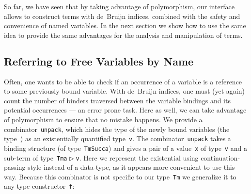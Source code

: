 \documentclass[9pt,preprint,authoryear]{sigplanconf}
\begin{document}
%
So far, we have seen that by taking advantage of polymorphism, 
    our interface allows to construct
    terms with de{~}Bruijn indices, combined with the safety and
    convenience of named variables. In the next section we show how
    to use the same idea to provide the same advantages for the analysis
    and manipulation of terms.%


\subsection{Referring to Free Variables by Name}

%
Often, one wants to be able to check if an
    occurrence of a variable is a reference to some previously bound
    variable. With de{~}Bruijn indices, one must (yet again) count the
    number of binders traversed between the variable bindings and
    its potential occurrences --- an error prone task. Here as well,
    we can take advantage of polymorphism to ensure that no mistake
    happens. We provide a combinator{~}\textcolor[rgb]{0,0,0.80}{\texttt{unpack}}, which hides the 
    type of the newly bound variables (the type{~}\textcolor[cmyk]{0,0.65,0.99,0}{\texttt{\makebox[1.22ex][l]{$ {(} $}}}\textcolor[cmyk]{0,0.65,0.99,0}{\texttt{\makebox[1.22ex][r]{$ {)} $}}}) as an existentially
    quantified type{~}\textcolor[rgb]{0,0,0.80}{\texttt{v}}. The combinator{~}\textcolor[rgb]{0,0,0.80}{\texttt{unpack}} takes a binding
    structure (of type{~}\textcolor[rgb]{0,0,0.80}{\texttt{Tm}}\textcolor[rgb]{0,0,0.80}{\texttt{\mbox{\hspace{0.50em}}}}\textcolor[cmyk]{0,0.65,0.99,0}{\texttt{\makebox[1.22ex][l]{$ {(} $}}}\textcolor[rgb]{0,0,0.80}{\texttt{Succ}}\textcolor[rgb]{0,0,0.80}{\texttt{\mbox{\hspace{0.50em}}}}\textcolor[rgb]{0,0,0.80}{\texttt{a}}\textcolor[cmyk]{0,0.65,0.99,0}{\texttt{\makebox[1.22ex][r]{$ {)} $}}}) and gives a pair of
    a value{~}\textcolor[rgb]{0,0,0.80}{\texttt{x}} of type{~}\textcolor[rgb]{0,0,0.80}{\texttt{v}} and a
    sub-term of type{~}\textcolor[rgb]{0,0,0.80}{\texttt{Tm}}\textcolor[rgb]{0,0,0.80}{\texttt{\mbox{\hspace{0.50em}}}}\textcolor[cmyk]{0,0.65,0.99,0}{\texttt{\makebox[1.22ex][l]{$ {(} $}}}\textcolor[rgb]{0,0,0.80}{\texttt{a}}\textcolor[rgb]{0,0,0.80}{\texttt{\mbox{\hspace{0.50em}}}}\textcolor[rgb]{0,0,0.80}{\texttt{$ \vartriangleright $}}\textcolor[rgb]{0,0,0.80}{\texttt{\mbox{\hspace{0.50em}}}}\textcolor[rgb]{0,0,0.80}{\texttt{v}}\textcolor[cmyk]{0,0.65,0.99,0}{\texttt{\makebox[1.22ex][r]{$ {)} $}}}. Here we represent the existential using
    continuation-passing style instead of a data-type, as it appears more convenient to use
    this way. 
    Because this combinator is not specific to our
    type{~}\textcolor[rgb]{0,0,0.80}{\texttt{Tm}} we generalize it to any type constructor{~}\textcolor[rgb]{0,0,0.80}{\texttt{f}}{:}%
\end{document}
